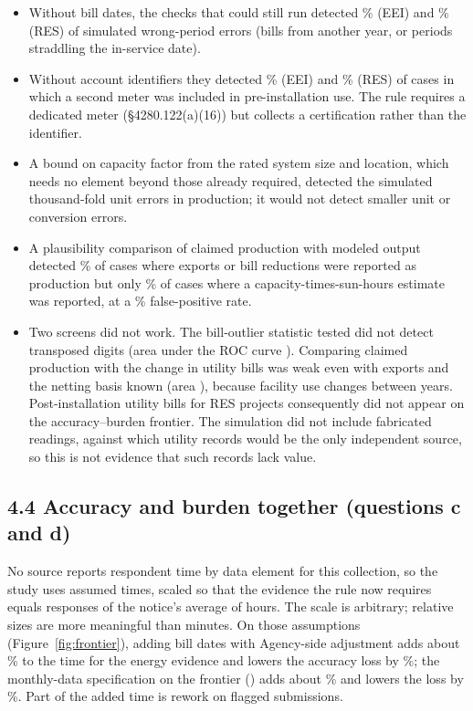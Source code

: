\documentclass[11pt]{article}
\begin{document}
\begin{itemize}
\item Without bill dates, the checks that could still run detected
\DetCurrentEeiPeriod\% (EEI) and \DetCurrentResPeriod\% (RES) of simulated wrong-period
errors (bills from another year, or periods straddling the in-service date).
\item Without account identifiers they detected \DetCurrentEeiDouble\% (EEI) and
\DetCurrentResDouble\% (RES) of cases in which a second meter was included in
pre-installation use. The rule requires a dedicated meter (\S4280.122(a)(16)) but
collects a certification rather than the identifier.
\item A bound on capacity factor from the rated system size and location, which needs no
element beyond those already required, detected the simulated thousand-fold unit errors
in production; it would not detect smaller unit or conversion errors.
\item A plausibility comparison of claimed production with modeled output detected
\DetRulePlausGrossNet\% of cases where exports or bill reductions were reported as
production but only \DetRulePlausNameplate\% of cases where a capacity-times-sun-hours
estimate was reported, at a \StatRuleFpr\% false-positive rate.
\item Two screens did not work. The bill-outlier statistic tested did not detect
transposed digits (area under the ROC curve \AucOutlierTransposed). Comparing claimed
production with the change in utility bills was weak even with exports and the netting
basis known (area \AucBillDiffGrossNet), because facility use changes between years.
Post-installation utility bills for RES projects consequently did not appear on the
accuracy--burden frontier. The simulation did not include fabricated readings, against
which utility records would be the only independent source, so this is not evidence
that such records lack value.
\end{itemize}

\subsection*{4.4 Accuracy and burden together (questions c and d)}

No source reports respondent time by data element for this collection, so the study uses
assumed times, scaled so that the evidence the rule now requires equals
\AnchorResponses{} responses of the notice's average of \AuditHoursPerResponse{} hours.
The scale is arbitrary; relative sizes are more meaningful than minutes. On those
assumptions (Figure~\ref{fig:frontier}), adding bill dates with Agency-side adjustment
adds about \DatesNormBurdenIncreasePct\% to the time for the energy evidence and lowers
the accuracy loss by \DatesNormMareReductionPct\%; the monthly-data specification on the
frontier (\RecElements) adds about \RecBurdenIncreasePct\% and lowers the loss by
\RecMareReductionPct\%. Part of the added time is rework on flagged submissions.
\end{document}
